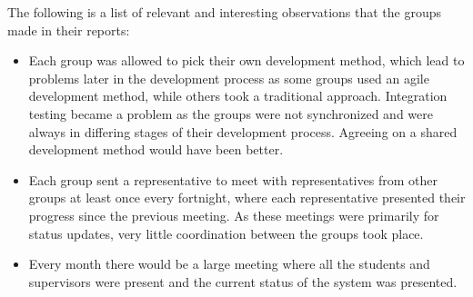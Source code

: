 The following is a list of relevant and interesting observations that the groups made in their reports:
\begin{itemize}
	\item{Each group was allowed to pick their own development method, which lead to problems later in the development process as some groups used an agile development method, while others took a traditional approach. 
	Integration testing became a problem as the groups were not synchronized and were always in differing stages of their development process. 
	Agreeing on a shared development method would have been better.}
	\item{Each group sent a representative to meet with representatives from other groups at least once every fortnight, where each representative presented their progress since the previous meeting. 
	As these meetings were primarily for status updates, very little coordination between the groups took place.}
	\item{Every month there would be a large meeting where all the students and supervisors were present and the current status of the system was presented.}
\end{itemize}

